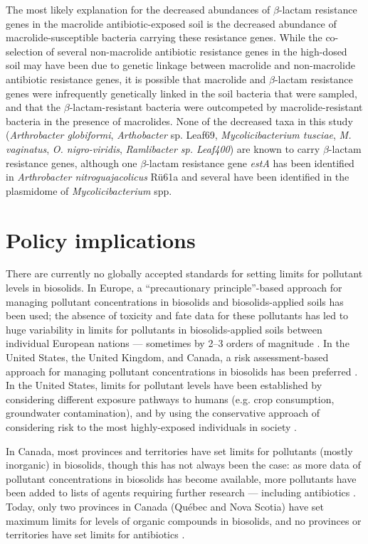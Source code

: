 The most likely explanation for the decreased abundances of $\beta$-lactam resistance genes in the macrolide antibiotic-exposed soil is the decreased abundance of macrolide-susceptible bacteria carrying these resistance genes.
While the co-selection of several non-macrolide antibiotic resistance genes in the high-dosed soil may have been due to genetic linkage between macrolide and non-macrolide antibiotic resistance genes, it is possible that macrolide and $\beta$-lactam resistance genes were infrequently genetically linked in the soil bacteria that were sampled, and that the $\beta$-lactam-resistant bacteria were outcompeted by macrolide-resistant bacteria in the presence of macrolides.
None of the decreased taxa in this study (\textit{Arthrobacter globiformi}, \textit{Arthobacter} sp. Leaf69, \textit{Mycolicibacterium tusciae}, \textit{M. vaginatus}, \textit{O. nigro-viridis}, \textit{Ramlibacter sp. Leaf400}) are known to carry $\beta$-lactam resistance genes, although one $\beta$-lactam resistance gene \textit{estA} has been identified in \textit{Arthrobacter nitroguajacolicus} Rü61a and several have been identified in the plasmidome of \textit{Mycolicibacterium} spp.

\section{Policy implications}

There are currently no globally accepted standards for setting limits for pollutant levels in biosolids.
In Europe, a “precautionary principle”-based approach for managing pollutant concentrations in biosolids and biosolids-applied soils has been used;
the absence of toxicity and fate data for these pollutants has led to huge variability in limits for pollutants in biosolids-applied soils between individual European nations --- sometimes by 2–3 orders of magnitude \parencite{McCarthy.2015}.
In the United States, the United Kingdom, and Canada, a risk assessment-based approach for managing pollutant concentrations in biosolids has been preferred \parencite{McCarthy.2015}.
In the United States, limits for pollutant levels have been established by considering different exposure pathways to humans (e.g. crop consumption, groundwater contamination), and by using the conservative approach of considering risk to the most highly-exposed individuals in society \parencite{McCarthy.2015}.

In Canada, most provinces and territories have set limits for pollutants (mostly inorganic) in biosolids, though this has not always been the case:
as more data of pollutant concentrations in biosolids has become available, more pollutants have been added to lists of agents requiring further research --- including antibiotics \parencite{Sabourin.2012, U.S.EnvironmentalProtectionAgency.2009, WaterEnvironmentAssociationofOntario.2010}.
Today, only two provinces in Canada (Québec and Nova Scotia) have set maximum limits for levels of organic compounds in biosolids, and no provinces or territories have set limits for antibiotics \parencite{McCarthy.2015}.

